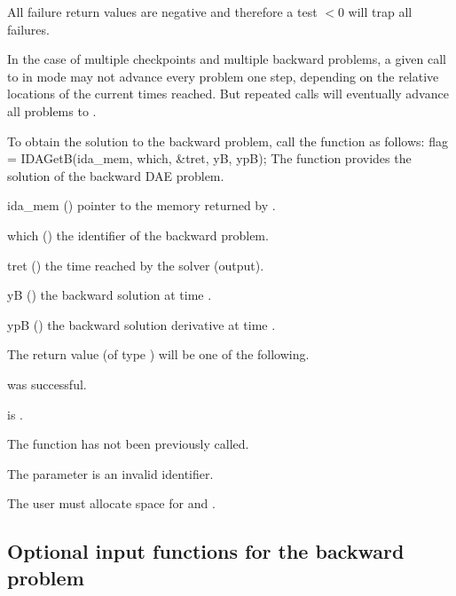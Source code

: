 {
  All failure return values are negative and therefore a test $< 0$
  will trap all  failures.

  In the case of multiple checkpoints and multiple backward problems, a given
  call to  in  mode may not advance every problem
  one step, depending on the relative locations of the current times reached.
  But repeated calls will eventually advance all problems to .
}
To obtain the solution  to the backward problem, call the function
 as follows:
{
  flag = IDAGetB(ida\_mem, which, \&tret, yB, ypB);
}
{
  The function  provides the solution  of the backward DAE
  problem.
}
{
  \begin{args}
  \item[ida\_mem] ()
    pointer to the {\idas} memory returned by .
  \item[which] ()
    the identifier of the backward problem.
  \item[tret] ()
    the time reached by the solver (output).
  \item[yB] ()
    the backward solution at time .
  \item[ypB] ()
    the backward solution derivative at time .
  \end{args}
}
{
  The return value  (of type ) will be one of the following.
  \begin{args}
  \item[\Id{IDA\_SUCCESS}] 
     was successful.
  \item[\Id{IDA\_MEM\_NULL}] 
     is .
  \item[\Id{IDA\_NO\_ADJ}]
    The function  has not been previously called.
   \item[\Id{IDA\_ILL\_INPUT}]
    The parameter  is an invalid identifier.
  \end{args} 
}
{
  {\warn} The user must allocate space for  and .
}


\subsection{Optional input functions for the backward problem}
\label{ss:optional_input_b}
